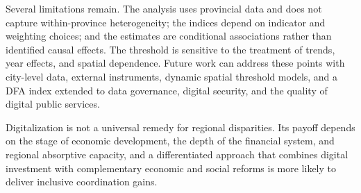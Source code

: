 Several limitations remain. The analysis uses provincial data and does not capture within-province heterogeneity; the indices depend on indicator and weighting choices; and the estimates are conditional associations rather than identified causal effects. The threshold is sensitive to the treatment of trends, year effects, and spatial dependence. Future work can address these points with city-level data, external instruments, dynamic spatial threshold models, and a DFA index extended to data governance, digital security, and the quality of digital public services.

Digitalization is not a universal remedy for regional disparities. Its payoff depends on the stage of economic development, the depth of the financial system, and regional absorptive capacity, and a differentiated approach that combines digital investment with complementary economic and social reforms is more likely to deliver inclusive coordination gains.

